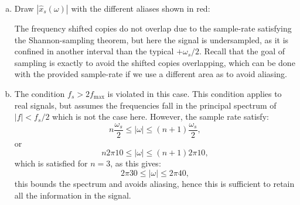 \begin{enumerate}
\begin{enumerate}[a)]
\item Draw $|\hat{x}_{s}(\omega)|$ with the different aliases shown in red:
\begin{center}
\end{center}
The frequency shifted copies do not overlap due to the sample-rate satisfying the Shannon-sampling theorem, but here
the signal is undersampled, as it is confined in another interval than the typical $+\omega_{s}/2$.
Recall that the goal of sampling is exactly to avoid the shifted copies overlapping, which can be done with the provided 
sample-rate if we use a different area as to avoid aliasing. 

\item The condition $f_{s}>2f_{\text{max}}$ is violated in this case. 
This condition applies to real signals, but assumes the frequencies fall in the principal spectrum of $|f|<f_{s}/2$ which is not the case here. 
However, the sample rate satisfy:
$$n\frac{\omega_{s}}{2}\le|\omega|\le(n+1)\frac{\omega_{s}}{2},$$
or
$$n2\pi 10\le|\omega|\le (n+1)2\pi10,$$
which is satisfied for $n=3$, as this gives:
$$2\pi 30\le |\omega|\le 2\pi 40,$$
this bounds the spectrum and avoids aliasing, hence this is sufficient to retain all the information in the signal. 


\end{enumerate}
\end{enumerate}
